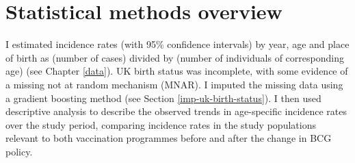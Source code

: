 \documentclass[11pt,twoside]{bristolthesis}
\begin{document}
  \hypertarget{statistical-methods-overview}{%
  \section{Statistical methods overview}\label{statistical-methods-overview}}
  
  I estimated incidence rates (with 95\% confidence intervals) by year, age and place of birth as (number of cases) divided by (number of individuals of corresponding age) (see Chapter \ref{data}). UK birth status was incomplete, with some evidence of a missing not at random mechanism (MNAR). I imputed the missing data using a gradient boosting method (see Section \ref{imp-uk-birth-status}). I then used descriptive analysis to describe the observed trends in age-specific incidence rates over the study period, comparing incidence rates in the study populations relevant to both vaccination programmes before and after the change in BCG policy.
  
\end{document}
